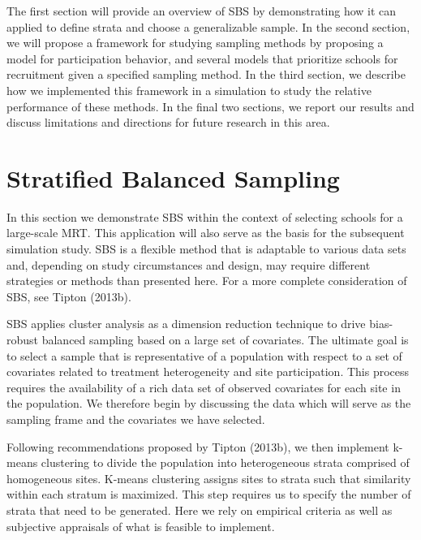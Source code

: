 \documentclass[man,floatsintext]{apa6}
\begin{document}
The first section will provide an overview of SBS by demonstrating how it can applied to define strata and choose a generalizable sample. In the second section, we will propose a framework for studying sampling methods by proposing a model for participation behavior, and several models that prioritize schools for recruitment given a specified sampling method. In the third section, we describe how we implemented this framework in a simulation to study the relative performance of these methods. In the final two sections, we report our results and discuss limitations and directions for future research in this area.

\hypertarget{stratified-balanced-sampling}{%
\section{Stratified Balanced Sampling}\label{stratified-balanced-sampling}}

 In this section we demonstrate SBS within the context of selecting schools for a large-scale MRT. This application will also serve as the basis for the subsequent simulation study. SBS is a flexible method that is adaptable to various data sets and, depending on study circumstances and design, may require different strategies or methods than presented here. For a more complete consideration of SBS, see Tipton (2013b).

SBS applies cluster analysis as a dimension reduction technique to drive bias-robust balanced sampling based on a large set of covariates. The ultimate goal is to select a sample that is representative of a population with respect to a set of covariates related to treatment heterogeneity and site participation. This process requires the availability of a rich data set of observed covariates for each site in the population. We therefore begin by discussing the data which will serve as the sampling frame and the covariates we have selected.

Following recommendations proposed by Tipton (2013b), we then implement k-means clustering to divide the population into heterogeneous strata comprised of homogeneous sites. K-means clustering assigns sites to strata such that similarity within each stratum is maximized. This step requires us to specify the number of strata that need to be generated. Here we rely on empirical criteria as well as subjective appraisals of what is feasible to implement.
\end{document}
